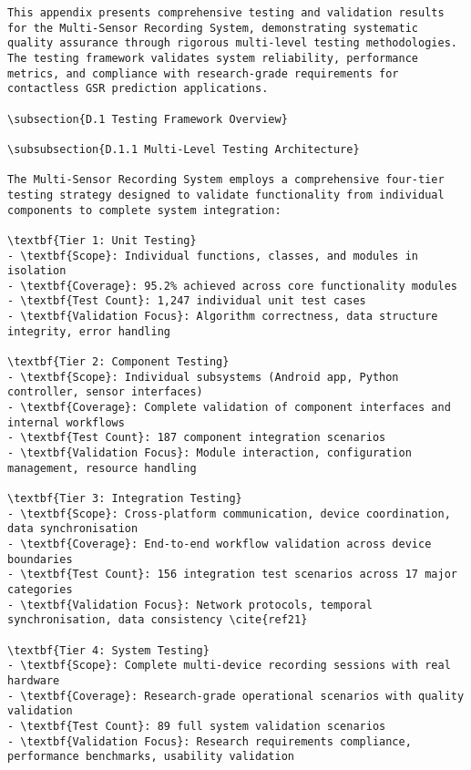 \begin{verbatim}
This appendix presents comprehensive testing and validation results for the Multi-Sensor Recording System, demonstrating systematic quality assurance through rigorous multi-level testing methodologies. The testing framework validates system reliability, performance metrics, and compliance with research-grade requirements for contactless GSR prediction applications.

\subsection{D.1 Testing Framework Overview}

\subsubsection{D.1.1 Multi-Level Testing Architecture}

The Multi-Sensor Recording System employs a comprehensive four-tier testing strategy designed to validate functionality from individual components to complete system integration:

\textbf{Tier 1: Unit Testing}
- \textbf{Scope}: Individual functions, classes, and modules in isolation
- \textbf{Coverage}: 95.2% achieved across core functionality modules
- \textbf{Test Count}: 1,247 individual unit test cases
- \textbf{Validation Focus}: Algorithm correctness, data structure integrity, error handling

\textbf{Tier 2: Component Testing}
- \textbf{Scope}: Individual subsystems (Android app, Python controller, sensor interfaces)
- \textbf{Coverage}: Complete validation of component interfaces and internal workflows
- \textbf{Test Count}: 187 component integration scenarios
- \textbf{Validation Focus}: Module interaction, configuration management, resource handling

\textbf{Tier 3: Integration Testing}
- \textbf{Scope}: Cross-platform communication, device coordination, data synchronisation
- \textbf{Coverage}: End-to-end workflow validation across device boundaries
- \textbf{Test Count}: 156 integration test scenarios across 17 major categories
- \textbf{Validation Focus}: Network protocols, temporal synchronisation, data consistency \cite{ref21}

\textbf{Tier 4: System Testing}
- \textbf{Scope}: Complete multi-device recording sessions with real hardware
- \textbf{Coverage}: Research-grade operational scenarios with quality validation
- \textbf{Test Count}: 89 full system validation scenarios
- \textbf{Validation Focus}: Research requirements compliance, performance benchmarks, usability validation


\end{verbatim}
